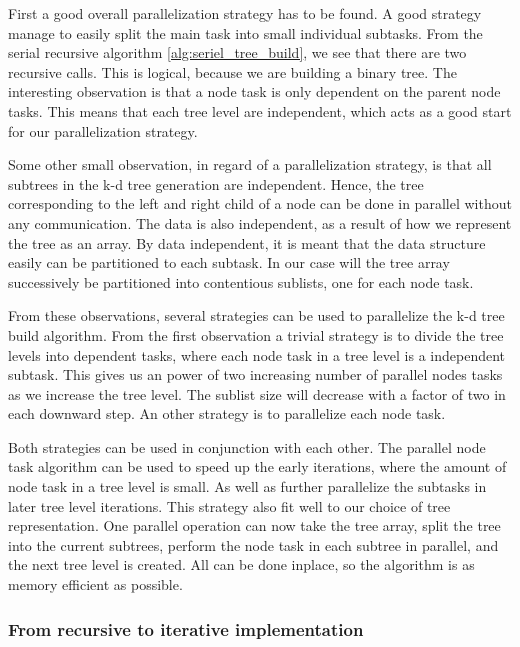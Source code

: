 First a good overall parallelization strategy has to be found. A good strategy manage to easily split the main task into small individual subtasks. From the serial recursive algorithm \ref{alg:seriel_tree_build}, we see that there are two recursive calls. This is logical, because we are building a binary tree.  The interesting observation is that a node task is only dependent on the parent node tasks. This means that each tree level are independent, which acts as a good start for our parallelization strategy.

Some other small observation, in regard of a parallelization strategy, is that all subtrees in the k-d tree generation are independent. Hence, the tree corresponding to the left and right child of a node can be done in parallel without any communication. The data is also independent, as a result of how we represent the tree as an array. By data independent, it is meant that the data structure easily can be partitioned to each subtask. In our case will the tree array successively be partitioned into contentious sublists, one for each node task.

From these observations, several strategies can be used to parallelize the k-d tree build algorithm. From the first observation a trivial strategy is to divide the tree levels into dependent tasks, where each node task in a tree level is a independent subtask. This gives us an power of two increasing number of parallel nodes tasks as we increase the tree level. The sublist size will decrease with a factor of two in each downward step. An other strategy is to parallelize each node task.

Both strategies can be used in conjunction with each other. The parallel node task algorithm can be used to speed up the early iterations, where the amount of node task in a tree level is small. As well as further parallelize the subtasks in later tree level iterations. This strategy also fit well to our choice of tree representation. One parallel operation can now take the tree array, split the tree into the current subtrees, perform the node task in each subtree in parallel, and the next tree level is created. All can be done inplace, so the algorithm is as memory efficient as possible.



\subsubsection{From recursive to iterative implementation} %
\label{ssub:from_recursive_to_iterative_implementation}

